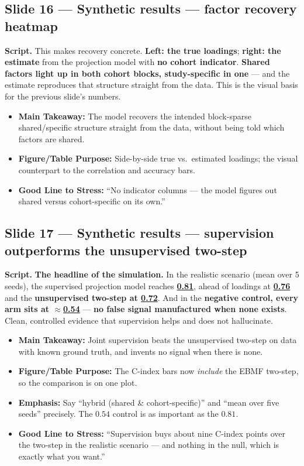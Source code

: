 \documentclass[11pt]{article}
\newcommand{\scriptlabel}{\textbf{Script. }}
\newcommand{\sectionlabel}[1]{\textbf{#1}}
\newcommand{\key}[1]{\textcolor{keyblue}{\textbf{#1}}}        %
\newcommand{\num}[1]{\textcolor{keycar}{\textbf{\uline{#1}}}} %
\begin{document}
\subsection*{Slide 16 --- Synthetic results --- factor recovery heatmap}
\scriptlabel This makes recovery concrete. \key{Left: the true loadings}; \key{right: the estimate}
from the projection model with \key{no cohort indicator}. \key{Shared factors light up in both
cohort blocks, study-specific in one} --- and the estimate reproduces that structure straight from
the data. This is the visual basis for the previous slide's numbers.

\begin{itemize}
\item \sectionlabel{Main Takeaway:} The model recovers the intended block-sparse shared/specific
structure straight from the data, without being told which factors are shared.
\item \sectionlabel{Figure/Table Purpose:} Side-by-side true vs.\ estimated loadings; the visual
counterpart to the correlation and accuracy bars.
\item \sectionlabel{Good Line to Stress:} ``No indicator columns --- the model figures out shared
versus cohort-specific on its own.''
\end{itemize}

\subsection*{Slide 17 --- Synthetic results --- supervision outperforms the unsupervised two-step}
\scriptlabel \key{The headline of the simulation.} In the realistic scenario (mean over 5 seeds),
the supervised projection model reaches \num{0.81}, ahead of loadings at \num{0.76} and the
\key{unsupervised two-step at \num{0.72}}. And in the \key{negative control, every arm sits at
$\approx$\num{0.54}} --- \key{no false signal manufactured when none exists}. Clean, controlled
evidence that supervision helps and does not hallucinate.

\begin{itemize}
\item \sectionlabel{Main Takeaway:} Joint supervision beats the unsupervised two-step on data with
known ground truth, and invents no signal when there is none.
\item \sectionlabel{Figure/Table Purpose:} The C-index bars now \emph{include} the EBMF two-step, so
the comparison is on one plot.
\item \sectionlabel{Emphasis:} Say ``hybrid (shared \& cohort-specific)'' and ``mean over five
seeds'' precisely. The $0.54$ control is as important as the $0.81$.
\item \sectionlabel{Good Line to Stress:} ``Supervision buys about nine C-index points over the
two-step in the realistic scenario --- and nothing in the null, which is exactly what you want.''
\end{itemize}
\end{document}
